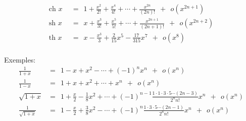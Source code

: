 \begin{frame}
\bigskip\bigskip
{}
\begin{align*}
\text{ch } x &\ \ =\ \  1 + \frac{x^2}{2!}+\frac{x^4}{4!}+ \cdots + \frac{x^{2n}}{(2n)!}\ \  + \ \ o(x^{2n+1}) \\[0.3cm]
\text{sh } x &\ \ =\ \  x + \frac{x^3}{3!}+\frac{x^5}{5!}+ \cdots + \frac{x^{2n+1}}{(2n+1)!}\ \  + \ \ o(x^{2n+2}) \\[0.3cm]
\text{th } x &\ \ =\ \  x -  \frac{x^3}{3} + \frac{2}{15}x^5 - \frac{17}{315}x^7\ \  + \ \ o(x^{8}) \\[0.9cm]
\end{align*}

\end{frame}


\begin{frame}
\vfil
{}

\end{frame}

\begin{frame}


\hspace*{-2em}

\pause
Exemples:
$$\begin{array}{rl}
\frac{1}{1+x} & =\ \ 1 -x+x^2-\cdots+(-1)^n x^n\ \ +\ \ o(x^n) \\[0.5cm]
\frac{1}{1-x} & =\ \ 1 + x+x^2+ \cdots+ x^n\ \ +\ \ o(x^n) \\[0.5cm]
\sqrt{1+x} & =\ \ 1 + \frac{x}{2} - \frac{1}{8}x^2+ \cdots +
(-1)^{n-1} \frac{1\cdot1\cdot3\cdot5\cdots(2n-3)}{2^n n!}x^n\ \  + \ \ o(x^n) \\[0.5cm]
\frac{1}{\sqrt{1+x}} & =\ \ 1 - \frac{x}{2} + \frac{3}{8}x^2- \cdots +
(-1)^{n} \frac{1\cdot3\cdot5\cdots(2n-1)}{2^n n!} x^n\ \ + \ \ o(x^n) 
\end{array}$$

\end{frame}

